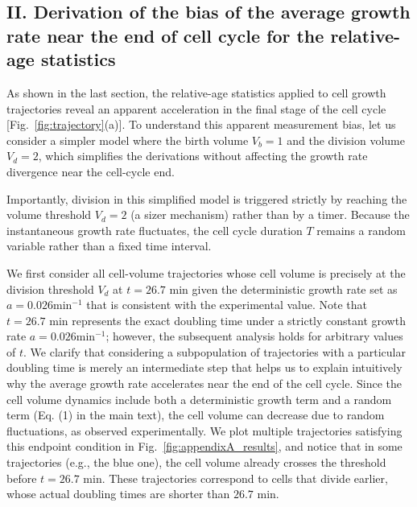 \documentclass[aps, prl, longbibliography, linenumbers, superscriptaddress]{revtex4-2}
\newcommand{\blue}{\color{blue}}
\newcommand{\blue}{}
\begin{document}
{\blue \subsection{II. Derivation of the bias of the average growth rate near the end of cell cycle for the relative-age statistics}}
As shown in the last section, the relative-age statistics applied to cell growth trajectories reveal an apparent acceleration in the final stage of the cell cycle [Fig.~\ref{fig:trajectory}(a)]. To understand this apparent measurement bias, let us consider a simpler model where the birth volume $V_b=1$ and the division volume $V_d=2$, which simplifies the derivations without affecting the growth rate divergence near the cell-cycle end. {\blue Importantly, division in this simplified model is triggered strictly by reaching the volume threshold $V_d = 2$ (a sizer mechanism) rather than by a timer. Because the instantaneous growth rate fluctuates, the cell cycle duration $T$ remains a random variable rather than a fixed time interval.

We first consider all cell-volume trajectories whose cell volume is precisely at the division threshold $V_d$ at $t=26.7\text{ min}$ {\blue given the deterministic growth rate set as $a=0.026 \text{min}^{-1}$ that is consistent with the experimental value. Note that $t = 26.7\text{ min}$ represents the exact doubling time under a strictly constant growth rate $a=0.026 \text{min}^{-1}$; however, the subsequent analysis holds for arbitrary values of $t$. We clarify that considering a subpopulation of trajectories with a particular doubling time is merely an intermediate step that helps us to explain intuitively why the average growth rate accelerates near the end of the cell cycle.} Since the cell volume dynamics include both a deterministic growth term and a random term {\blue (Eq. (1) in the main text),} the cell volume can decrease due to random fluctuations, as observed experimentally. We plot multiple trajectories satisfying this endpoint condition in Fig.~\ref{fig:appendixA_results}, and notice that in some trajectories (e.g., the blue one), the cell volume already crosses the threshold before $t=26.7\text{ min}$. These trajectories correspond to cells that divide earlier, whose actual doubling times are shorter than $26.7\text{ min}$.

}
\end{document}
